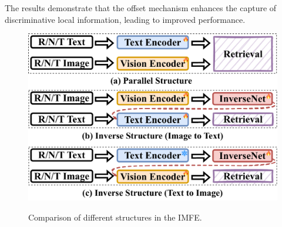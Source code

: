 %
The results demonstrate that the offset mechanism enhances the capture of discriminative local information, leading to improved performance.
\begin{figure}[t]
  \centering
    \resizebox{0.475\textwidth}{!}
    {
  \includegraphics[width=30\linewidth]{sec/supp_img/Comparision_Parrel.pdf}
  }
  \vspace{-4mm}
   \caption{Comparison of different structures in the IMFE.}
  \label{fig:inverse_direction}
  \vspace{-2mm}
\end{figure}
